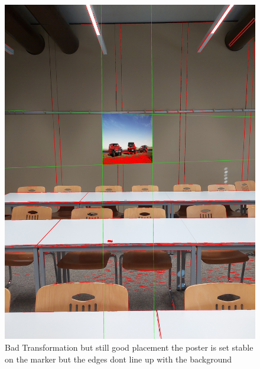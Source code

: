 \documentclass[a4paper,twocolumn]{article}
\begin{document}
\begin{figure}[h!]
\centering
\includegraphics[width=0.9\columnwidth]{img/20221115_113319.jpg} %
\caption{Bad Transformation but still good placement the poster is set stable on the marker but the edges dont line up with the background }
\label{fig:20221115_113319.jpg}
\end{figure}
\end{document}
